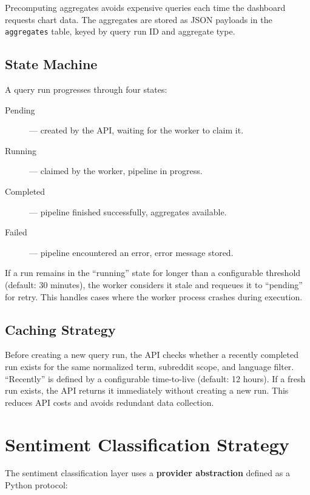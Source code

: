 \begin{sloppypar}
Precomputing aggregates avoids expensive queries each time the dashboard requests chart data. The aggregates are stored as JSON payloads in the \texttt{aggregates} table, keyed by query run ID and aggregate type.
\end{sloppypar}

\subsection{State Machine}

A query run progresses through four states:

\begin{description}
    \item[Pending] --- created by the API, waiting for the worker to claim it.
    \item[Running] --- claimed by the worker, pipeline in progress.
    \item[Completed] --- pipeline finished successfully, aggregates available.
    \item[Failed] --- pipeline encountered an error, error message stored.
\end{description}

If a run remains in the ``running'' state for longer than a configurable threshold (default: 30 minutes), the worker considers it stale and requeues it to ``pending'' for retry. This handles cases where the worker process crashes during execution.

\subsection{Caching Strategy}

Before creating a new query run, the API checks whether a recently completed run exists for the same normalized term, subreddit scope, and language filter. ``Recently'' is defined by a configurable time-to-live (default: 12 hours). If a fresh run exists, the API returns it immediately without creating a new run. This reduces API costs and avoids redundant data collection.

\section{Sentiment Classification Strategy}
\label{sec:sentiment_strategy}

The sentiment classification layer uses a \textbf{provider abstraction} defined as a Python protocol:

